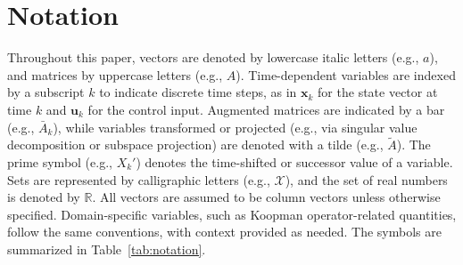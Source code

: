 \section*{Notation}

Throughout this paper, vectors are denoted by lowercase italic letters (e.g., \(a\)), and matrices by uppercase letters (e.g., \(A\)). Time-dependent variables are indexed by a subscript \(k\) to indicate discrete time steps, as in \(\mathbf{x}_k\) for the state vector at time \(k\) and \(\mathbf{u}_k\) for the control input. Augmented matrices are indicated by a bar (e.g., \(\bar{A}_k\)), while variables transformed or projected (e.g., via singular value decomposition or subspace projection) are denoted with a tilde (e.g., \(\tilde{A}\)). The prime symbol (e.g., \(X_k'\)) denotes the time-shifted or successor value of a variable. Sets are represented by calligraphic letters (e.g., \(\mathcal{X}\)), and the set of real numbers is denoted by \(\mathbb{R}\). All vectors are assumed to be column vectors unless otherwise specified. Domain-specific variables, such as Koopman operator-related quantities, follow the same conventions, with context provided as needed. The symbols are summarized in Table~\ref{tab:notation}.

